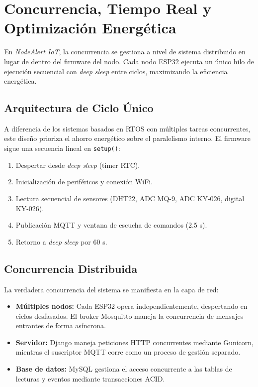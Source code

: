 \documentclass[11pt,a4paper]{article}
\begin{document}
\section{Concurrencia, Tiempo Real y Optimización Energética}

En \textit{NodeAlert IoT}, la concurrencia se gestiona a nivel de sistema distribuido en lugar de dentro del firmware del nodo. Cada nodo ESP32 ejecuta un único hilo de ejecución secuencial con \textit{deep sleep} entre ciclos, maximizando la eficiencia energética.

\subsection{Arquitectura de Ciclo Único}
A diferencia de los sistemas basados en RTOS con múltiples tareas concurrentes, este diseño prioriza el ahorro energético sobre el paralelismo interno. El firmware sigue una secuencia lineal en \texttt{setup()}:

\begin{enumerate}
    \item Despertar desde \textit{deep sleep} (timer RTC).
    \item Inicialización de periféricos y conexión WiFi.
    \item Lectura secuencial de sensores (DHT22, ADC MQ-9, ADC KY-026, digital KY-026).
    \item Publicación MQTT y ventana de escucha de comandos (2.5 s).
    \item Retorno a \textit{deep sleep} por 60 s.
\end{enumerate}

\subsection{Concurrencia Distribuida}
La verdadera concurrencia del sistema se manifiesta en la capa de red:
\begin{itemize}
    \item \textbf{Múltiples nodos:} Cada ESP32 opera independientemente, despertando en ciclos desfasados. El broker Mosquitto maneja la concurrencia de mensajes entrantes de forma asíncrona.
    \item \textbf{Servidor:} Django maneja peticiones HTTP concurrentes mediante Gunicorn, mientras el suscriptor MQTT corre como un proceso de gestión separado.
    \item \textbf{Base de datos:} MySQL gestiona el acceso concurrente a las tablas de lecturas y eventos mediante transacciones ACID.
\end{itemize}
\end{document}
